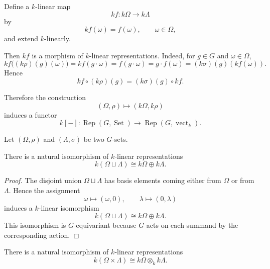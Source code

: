 Define a \(k\)-linear map
\[
    kf:k\Omega\longrightarrow k\Lambda
\]
by
\[
    kf(\omega)=f(\omega),
    \qquad \omega\in\Omega,
\]
and extend \(k\)-linearly.

Then \(kf\) is a morphism of \(k\)-linear representations. Indeed, for \(g\in G\) and
\(\omega\in\Omega\),
\[
    kf\bigl((k\rho)(g)(\omega)\bigr)
    =
    kf(g\cdot\omega)
    =
    f(g\cdot\omega)
    =
    g\cdot f(\omega)
    =
    (k\sigma)(g)(kf(\omega)).
\]
Hence
\[
    kf\circ (k\rho)(g)=(k\sigma)(g)\circ kf.
\]

Therefore the construction
\[
    (\Omega,\rho)\longmapsto (k\Omega,k\rho)
\]
induces a functor
\[
    k[-]:
    \operatorname{Rep}(G,\operatorname{Set})
    \longrightarrow
    \operatorname{Rep}(G,\operatorname{vect}_k).
\]


Let \((\Omega,\rho)\) and \((\Lambda,\sigma)\) be two \(G\)-sets.

\begin{proposition}
    There is a natural isomorphism of \(k\)-linear representations
    \[
        k(\Omega\sqcup \Lambda)
        \cong
        k\Omega\oplus k\Lambda.
    \]
\end{proposition}

\begin{proof}
    The disjoint union \(\Omega\sqcup\Lambda\) has basis elements coming either from
    \(\Omega\) or from \(\Lambda\). Hence the assignment
    \[
        \omega\longmapsto (\omega,0),
        \qquad
        \lambda\longmapsto (0,\lambda)
    \]
    induces a \(k\)-linear isomorphism
    \[
        k(\Omega\sqcup\Lambda)
        \cong
        k\Omega\oplus k\Lambda.
    \]
    This isomorphism is \(G\)-equivariant because \(G\) acts on each summand by the
    corresponding action.
\end{proof}

\begin{proposition}
    There is a natural isomorphism of \(k\)-linear representations
    \[
        k(\Omega\times \Lambda)
        \cong
        k\Omega\otimes_k k\Lambda.
    \]
\end{proposition}

